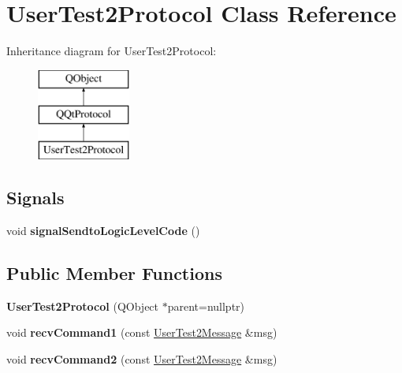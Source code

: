 \hypertarget{class_user_test2_protocol}{}\section{User\+Test2\+Protocol Class Reference}
\label{class_user_test2_protocol}
Inheritance diagram for User\+Test2\+Protocol\+:\begin{figure}[H]
\begin{center}
\leavevmode
\includegraphics[height=3.000000cm]{class_user_test2_protocol}
\end{center}
\end{figure}
\subsection*{Signals}
\begin{DoxyCompactItemize}
\item 
\mbox{\label{class_user_test2_protocol_aaad64637eb70bb72be258157dc890b0b}} 
void {\bfseries signal\+Sendto\+Logic\+Level\+Code} ()
\end{DoxyCompactItemize}
\subsection*{Public Member Functions}
\begin{DoxyCompactItemize}
\item 
\mbox{\label{class_user_test2_protocol_a99e33de0f1bd09899e99a72ba7b4c839}} 
{\bfseries User\+Test2\+Protocol} (Q\+Object $\ast$parent=nullptr)
\item 
\mbox{\label{class_user_test2_protocol_a9171e7f3bdb3c5575343f76daa2edf6e}} 
void {\bfseries recv\+Command1} (const \mbox{\hyperlink{class_user_test2_message}{User\+Test2\+Message}} \&msg)
\item 
\mbox{\label{class_user_test2_protocol_a5f3e5f74ae5f65987ada353d3bee1d07}} 
void {\bfseries recv\+Command2} (const \mbox{\hyperlink{class_user_test2_message}{User\+Test2\+Message}} \&msg)
\end{DoxyCompactItemize}
